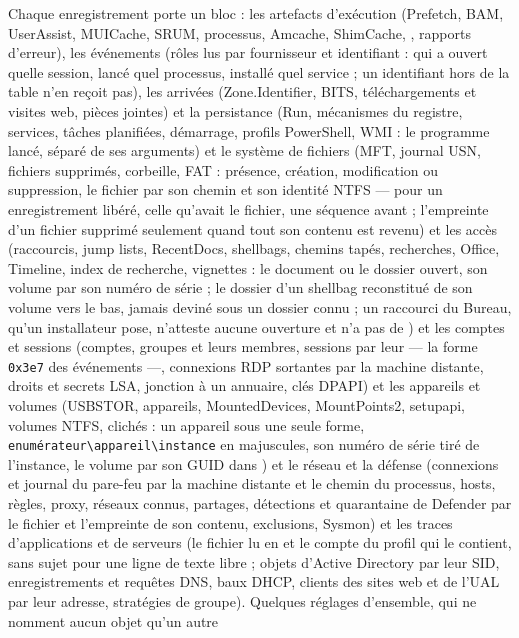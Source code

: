 \documentclass[11pt,a4paper,oneside]{report}
\begin{document}
Chaque enregistrement porte un bloc  : les artefacts
d'exécution (Prefetch, BAM, UserAssist, MUICache, SRUM, processus, Amcache,
ShimCache, , rapports d'erreur), les événements
(rôles lus par fournisseur et identifiant : qui a ouvert quelle session, lancé
quel processus, installé quel service ; un identifiant hors de la table n'en
reçoit pas), les arrivées (Zone.Identifier, BITS, téléchargements et visites
web, pièces jointes) et la persistance (Run, mécanismes du registre,
services, tâches planifiées, démarrage, profils PowerShell, WMI : le programme
lancé, séparé de ses arguments) et le système de fichiers (MFT, journal USN,
fichiers supprimés, corbeille, FAT : présence, création, modification ou
suppression, le fichier par son chemin et son identité NTFS --- pour un
enregistrement libéré, celle qu'avait le fichier, une séquence avant ; l'empreinte
d'un fichier supprimé seulement quand tout son contenu est revenu) et les
accès (raccourcis, jump lists, RecentDocs, shellbags, chemins tapés,
recherches, Office, Timeline, index de recherche, vignettes : le document ou
le dossier ouvert, son volume par son numéro de série ; le dossier d'un
shellbag reconstitué de son volume vers le bas, jamais deviné sous un dossier
connu ; un raccourci du Bureau, qu'un installateur pose, n'atteste aucune
ouverture et n'a pas de ) et les comptes et sessions (comptes,
groupes et leurs membres, sessions par leur  --- la forme
\texttt{0x3e7} des événements ---, connexions RDP sortantes par la machine
distante, droits et secrets LSA, jonction à un annuaire, clés DPAPI) et les
appareils et volumes (USBSTOR, appareils, MountedDevices, MountPoints2,
setupapi, volumes NTFS, clichés : un appareil sous une seule forme,
\texttt{enumérateur\textbackslash appareil\textbackslash instance} en
majuscules, son numéro de série tiré de l'instance, le volume par son GUID
dans ) et le réseau et la défense (connexions et journal du
pare-feu par la machine distante et le chemin du processus, hosts, règles,
proxy, réseaux connus, partages, détections et quarantaine de Defender par le
fichier et l'empreinte de son contenu, exclusions, Sysmon) et les traces
d'applications et de serveurs (le fichier lu en  et le compte
du profil qui le contient, sans sujet pour une ligne de texte libre ; objets
d'Active Directory par leur SID, enregistrements et requêtes DNS, baux DHCP,
clients des sites web et de l'UAL par leur adresse, stratégies de groupe).
Quelques réglages d'ensemble, qui ne nomment aucun objet qu'un autre
\end{document}
